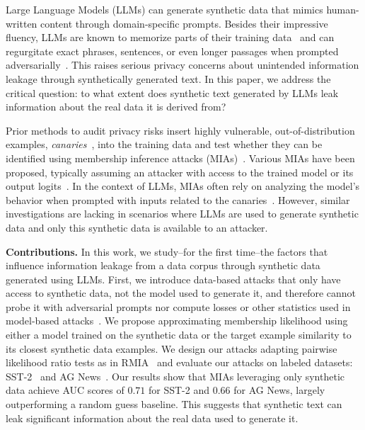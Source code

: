 
Large Language Models (LLMs) can generate synthetic data that mimics human-written content through domain-specific prompts. Besides their impressive fluency, LLMs are known to memorize parts of their training data~\citep{carlini2022quantifying} and can regurgitate exact phrases, sentences, or even longer passages when prompted adversarially~\citep{snapshotattack,carlini2021extracting,nasr2023scalable}. This raises serious privacy concerns about unintended information leakage through synthetically generated text. In this paper, we address the critical question: to what extent does synthetic text generated by LLMs leak information about the real data it is derived from?

Prior methods to audit privacy risks insert highly vulnerable, out-of-distribution examples, \textit{canaries}~\citep{carlini2019secret}, into the training data and test whether they can be identified using membership inference attacks (MIAs)~\citep{shokri2017membership}. Various MIAs have been proposed, typically assuming an attacker with access to the trained model or its output logits~\citep{carlini2019secret,shi2024detecting}. In the context of LLMs, MIAs often rely on analyzing the model's behavior when prompted with inputs related to the canaries~\citep{carlini2021extracting,chang2024context,shi2024detecting}. However, similar investigations are lacking in scenarios where LLMs are used to generate synthetic data and only this synthetic data is available to an attacker. 


\textbf{Contributions.} In this work, we study--for the first time--the factors that influence information leakage from a data corpus through synthetic data generated using LLMs.
First, we introduce data-based attacks that only have access to synthetic data, not the model used to generate it, and therefore cannot probe it with adversarial prompts nor compute losses or other statistics used in model-based attacks~\citep{ye2022enhanced, carlini2022membership}. We propose approximating membership likelihood using either a model trained on the synthetic data or the target example similarity to its closest synthetic data examples. We design our attacks adapting pairwise likelihood ratio tests as in RMIA~\citep{zarifzadeh2024low} and evaluate our attacks on labeled datasets: SST-2~\citep{socher-etal-2013-recursive} and AG News~\citep{Zhang2015CharacterlevelCN}. Our results show that MIAs leveraging only synthetic data achieve AUC scores of $0.71$ for SST-2 and $0.66$ for AG News, largely outperforming a random guess baseline. This suggests that synthetic text can leak significant information about the real data used to generate it.


